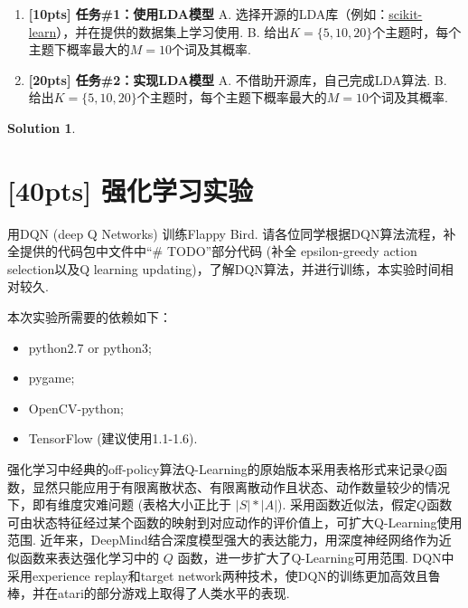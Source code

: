 \documentclass[a4paper,UTF8]{article}
\numberwithin{equation}{section}
\newtheorem*{mySol}{Solution}
\begin{document}
\begin{enumerate}[(1)]
	\item \textbf{[10pts] 任务\#1：使用LDA模型} 
	\subitem A. 选择开源的LDA库（例如：\href{https://scikit-learn.org/stable/modules/generated/sklearn.decomposition.LatentDirichletAllocation.html}{scikit-learn}），并在提供的数据集上学习使用.
	\subitem B. 给出$K=\{5,10,20\}$个主题时，每个主题下概率最大的$M=10$个词及其概率.
	\item \textbf{[20pts] 任务\#2：实现LDA模型} 
	\subitem A. 不借助开源库，自己完成LDA算法.
	\subitem B. 给出$K=\{5,10,20\}$个主题时，每个主题下概率最大的$M=10$个词及其概率.
\end{enumerate}
\begin{mySol}

\end{mySol}
\newpage


\section{[40pts] 强化学习实验}
用DQN (deep Q Networks) 训练Flappy Bird. 请各位同学根据DQN算法流程，补全提供的代码包中文件中“\# TODO”部分代码 (补全 epsilon-greedy action selection以及Q learning updating)，了解DQN算法，并进行训练，本实验时间相对较久.

本次实验所需要的依赖如下：
\begin{itemize}
	\item python2.7 or python3;
	\item pygame;
	\item OpenCV-python;
	\item TensorFlow (建议使用1.1-1.6).
\end{itemize}

强化学习中经典的off-policy算法Q-Learning的原始版本采用表格形式来记录$Q$函数，显然只能应用于有限离散状态、有限离散动作且状态、动作数量较少的情况下，即有维度灾难问题 (表格大小正比于 $|S|*|A|$). 采用函数近似法，假定$Q$函数可由状态特征经过某个函数的映射到对应动作的评价值上，可扩大Q-Learning使用范围. 近年来，DeepMind结合深度模型强大的表达能力，用深度神经网络作为近似函数来表达强化学习中的 $Q$ 函数，进一步扩大了Q-Learning可用范围. DQN中采用experience replay和target network两种技术，使DQN的训练更加高效且鲁棒，并在atari的部分游戏上取得了人类水平的表现.
\end{document}
